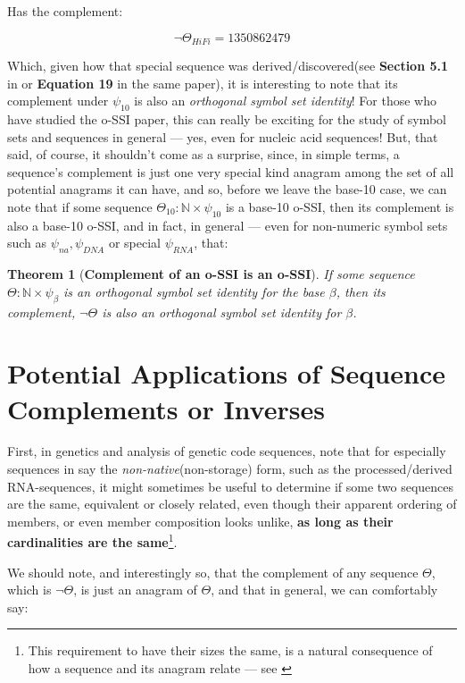\documentclass[a4paper, 18pt]{book} %
\newtheorem{theo}{Theorem}
\begin{document}
Has the complement:


\begin{equation}
\lnot\Theta_{HiFi} = 1 3 5 0 8 6 2 4 7 9
\end{equation}

Which, given how that special sequence was derived/discovered(see \textbf{Section 5.1} in \cite{ossipaper} or \textbf{Equation 19} in the same paper), it is interesting to note that its complement under $\psi_{10}$ is also an \textit{orthogonal symbol set identity}! For those who have studied the o-SSI paper\cite{ossipaper}, this can really be exciting for the study of symbol sets and sequences in general --- yes, even for nucleic acid sequences! But, that said, of course, it shouldn't come as a surprise, since, in simple terms, a sequence's complement is just one very special kind anagram among the set of all potential anagrams it can have, and so, before we leave the base-10 case, we can note that if some sequence $\Theta_{10}: \mathbb{N} \times \psi_{10}$ is a base-10 o-SSI, then its complement is also a base-10 o-SSI, and in fact, in general --- even for non-numeric symbol sets such as $\psi_{na}, \psi_{DNA}$ or special $\psi_{RNA}$, that:


\begin{theo}[\textbf{Complement of an o-SSI is an o-SSI}]
\label{THEOCOMPLOSSI}
If some sequence $\Theta: \mathbb{N} \times \psi_\beta$ is an orthogonal symbol set identity for the base $\beta$, then its complement, $\lnot\Theta$ is also an orthogonal symbol set identity for $\beta$.
\end{theo}

\section{Potential Applications of Sequence Complements or Inverses}
\label{SECAPPCOMPLEMENTS}

First, in genetics and analysis of genetic code sequences, note that for especially sequences in say the \textit{non-native}(non-storage) form, such as the processed/derived RNA-sequences, it might sometimes be useful to determine if some two sequences are the same, equivalent or closely related, even though their apparent ordering of members, or even member composition looks unlike, \textbf{as long as their cardinalities are the same}\footnote{This requirement to have their sizes the same, is a natural consequence of how a sequence and its anagram relate --- see \cite{adtpaper}}.

We should note, and interestingly so, that the complement of any sequence $\Theta$, which is $\lnot\Theta$, is just an anagram of $\Theta$, and that in general, we can comfortably say:
\end{document}
